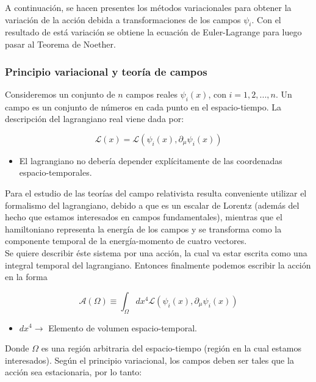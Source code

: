 \documentclass[12pt]{article}
\begin{document}
A continuación, se hacen presentes los métodos variacionales para obtener la variación de la acción debida a transformaciones de los campos $\psi_i$. Con el resultado de está variación se obtiene la ecuación de Euler-Lagrange para luego pasar al Teorema de Noether. 

\subsubsection{Principio variacional y teoría de campos}

Consideremos un conjunto de $n$ campos reales $\psi_i(x)$, con $i=1,2,...,n$. Un campo es un conjunto de números en cada punto en el espacio-tiempo. La descripción del lagrangiano real viene dada por: 

\begin{equation}
    \mathcal{L}(x)= \mathcal{L}(\psi_i(x), \partial_\mu\psi_i(x))
\end{equation}

\begin{itemize}
\item El lagrangiano no debería depender explícitamente de las coordenadas espacio-temporales.

\end{itemize}

Para el estudio de las teorías del campo relativista resulta conveniente utilizar el formalismo del lagrangiano, debido a que es un escalar de Lorentz (además del hecho que estamos interesados en campos fundamentales),  mientras que el hamiltoniano representa la energía de los campos y se transforma como la componente temporal de la energía-momento de cuatro vectores. \\ 

Se quiere describir éste sistema por una acción, la cual va estar escrita como una integral temporal del lagrangiano. Entonces finalmente podemos escribir la acción en la forma

\begin{equation}
    \mathcal{A}(\Omega) \equiv \int_\Omega dx^4 \mathcal{L}(\psi_i(x), \partial_\mu\psi_i(x))
\end{equation}

\begin{itemize}
    \item $dx^4 \rightarrow  $ Elemento de volumen espacio-temporal.
\end{itemize}

Donde $\Omega$ es una región arbitraria del espacio-tiempo (región en la cual estamos interesados). Según el principio variacional, los campos deben ser tales que la acción sea estacionaria, por lo tanto: 
\end{document}
